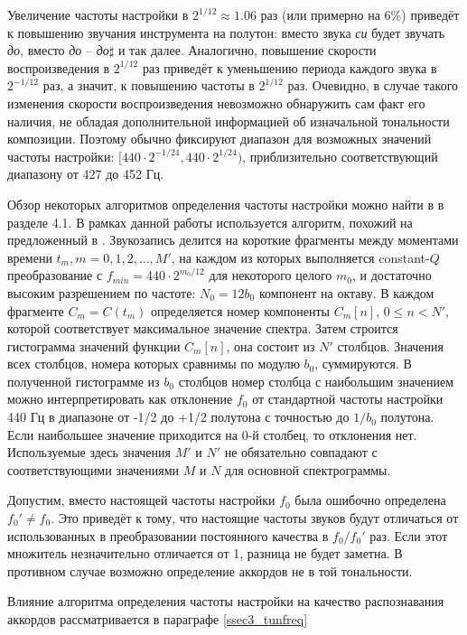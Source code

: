 Увеличение частоты настройки в $2^{1/12} \approx 1.06$ раз (или примерно на 6\%)
приведёт к повышению звучания инструмента на полутон: вместо звука \emph{си}
будет звучать \emph{до}, вместо \emph{до} -- \emph{до}$\sharp$ и так далее.
Аналогично, повышение скорости воспроизведения в $2^{1/12}$ раз приведёт к
уменьшению периода каждого звука в $2^{-1/12}$ раз, а значит, к повышению
частоты в $2^{1/12}$ раз. Очевидно, в случае такого изменения скорости
воспроизведения невозможно обнаружить сам факт его наличия, не обладая
дополнительной информацией об изначальной тональности композиции. Поэтому обычно
фиксируют диапазон для возможных значений частоты настройки: $[440 \cdot
2^{-1/24}, 440 \cdot 2^{1/24})$, приблизительно соответствующий диапазону от 427
до 452 Гц.

Обзор некоторых алгоритмов определения частоты настройки можно найти в
\cite{Lerch2006} в разделе 4.1. В рамках данной работы используется алгоритм,
похожий на предложенный в \cite{Zhu2005}. Звукозапись делится на короткие
фрагменты между моментами времени $t_m, m = 0, 1, 2, \dots, M'$, на каждом из
которых выполняется constant-$Q$ преобразование с $f_{min} = 440 \cdot
2^{m_0/12}$ для некоторого целого $m_0$, и достаточно высоким разрешением по
частоте: $N_0 = 12 b_0$ компонент на октаву. В каждом фрагменте $C_m = C(t_m)$
определяется номер компоненты $C_m[n]$, $0 \leq n < N'$, которой соответствует
максимальное значение спектра. Затем строится гистограмма значений функции
$C_m[n]$, она состоит из $N'$ столбцов. Значения всех столбцов, номера которых
сравнимы по модулю $b_0$, суммируются. В полученной гистограмме из $b_0$
столбцов номер столбца с наибольшим значением можно интерпретировать как
отклонение $f_0$ от стандартной частоты настройки 440 Гц в диапазоне от -1/2 до
+1/2 полутона с точностью до $1/b_0$ полутона. Если наибольшее значение
приходится на 0-й столбец, то отклонения нет. Используемые здесь значения $M'$ и
$N'$ не обязательно совпадают с соответствующими значениями $M$ и $N$ для
основной спектрограммы.

Допустим, вместо настоящей частоты настройки $f_0$ была ошибочно определена
$f_0' \neq f_0$. Это приведёт к тому, что настоящие частоты звуков будут
отличаться от использованных в преобразовании постоянного качества в $f_0 /
f_0'$ раз. Если этот множитель незначительно отличается от 1, разница не будет
заметна. В противном случае возможно определение аккордов не в той тональности.

Влияние алгоритма определения частоты настройки на качество распознавания
аккордов рассматривается в параграфе \ref{ssec3_tunfreq}

